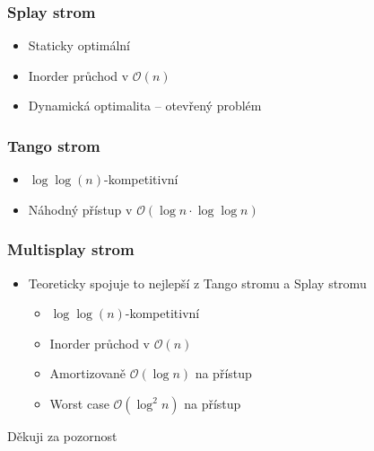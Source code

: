 \documentclass{beamer}
\begin{document}
\begin{frame}
\frametitle{Splay strom}
\begin{itemize}
\item Staticky optimální
\item Inorder průchod v $\mathcal O(n)$
\item Dynamická optimalita -- otevřený problém
\end{itemize}
\end{frame}

\begin{frame}
\frametitle{Tango strom}
\begin{itemize}
\item $\log\log(n)$-kompetitivní
\item Náhodný přístup v $\mathcal O(\log n \cdot \log\log n)$
\end{itemize}
\end{frame}

\begin{frame}
\frametitle{Multisplay strom}
\begin{itemize}
\item Teoreticky spojuje to nejlepší z Tango stromu a Splay stromu
\begin{itemize}
\item $\log\log(n)$-kompetitivní
\item Inorder průchod v $\mathcal O(n)$
\item Amortizovaně $\mathcal O(\log n)$ na přístup
\item Worst case $\mathcal O(\log^2 n)$ na přístup

\end{itemize}

\end{itemize}
\end{frame}





\begin{frame}
\Huge{\centerline{Děkuji za pozornost}}
\end{frame}

\end{document}
